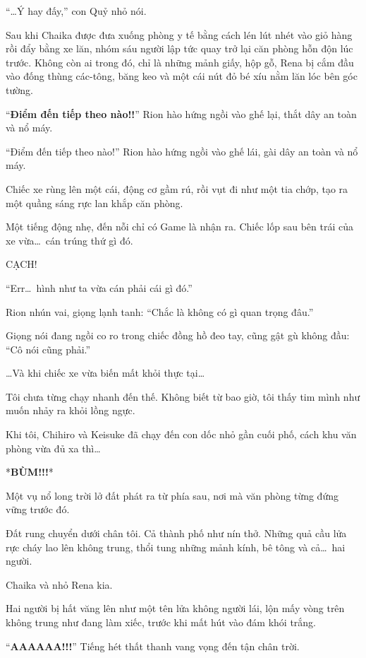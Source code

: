 \documentclass[../main.tex]{subfiles}
\begin{document}
``\dots Ý hay đấy,'' con Quỷ nhỏ nói.

\pov{-}

Sau khi Chaika được đưa xuống phòng y tế bằng cách lén lút nhét vào giỏ hàng rồi đẩy bằng xe lăn, nhóm sáu người lập tức quay trở lại căn phòng hỗn độn lúc trước. Không còn ai trong đó, chỉ là những mảnh giấy, hộp gỗ, Rena bị cắm đầu vào đống thùng các-tông, băng keo và một cái nút đỏ bé xíu nằm lăn lóc bên góc tường.

``\textbf{Điểm đến tiếp theo nào!!}'' Rion hào hứng ngồi vào ghế lại, thắt dây an toàn và nổ máy.

``Điểm đến tiếp theo nào!'' Rion hào hứng ngồi vào ghế lái, gài dây an toàn và nổ máy.

Chiếc xe rùng lên một cái, động cơ gầm rú, rồi vụt đi như một tia chớp, tạo ra một quầng sáng rực lan khắp căn phòng.

Một tiếng động nhẹ, đến nỗi chỉ có Game là nhận ra. Chiếc lốp sau bên trái của xe vừa\dots\ cán trúng thứ gì đó.

CẠCH!

``Err\dots\ hình như ta vừa cán phải cái gì đó.''

Rion nhún vai, giọng lạnh tanh: ``Chắc là không có gì quan trọng đâu.''

Giọng nói đang ngồi co ro trong chiếc đồng hồ đeo tay, cũng gật gù không đầu: ``Cô nói cũng phải.''

\dots Và khi chiếc xe vừa biến mất khỏi thực tại\dots


Tôi chưa từng chạy nhanh đến thế.
Không biết từ bao giờ, tôi thấy tim mình như muốn nhảy ra khỏi lồng ngực.

Khi tôi, Chihiro và Keisuke đã chạy đến con dốc nhỏ gần cuối phố, cách khu văn phòng vừa đủ xa thì\dots

*{\Large \textbf{BÙM!!!}}*

Một vụ nổ long trời lở đất phát ra từ phía sau, nơi mà văn phòng từng đứng vững trước đó.

Đất rung chuyển dưới chân tôi. Cả thành phố như nín thở. Những quả cầu lửa rực cháy lao lên không trung, thổi tung những mảnh kính, bê tông và cả\dots\ hai người.

Chaika và nhỏ Rena kia.

Hai người bị hất văng lên như một tên lửa không người lái, lộn mấy vòng trên không trung như đang làm xiếc, trước khi mất hút vào đám khói trắng.

``\textbf{AAAAAA!!!}'' Tiếng hét thất thanh vang vọng đến tận chân trời.
\end{document}
